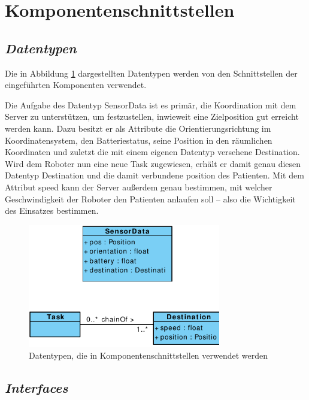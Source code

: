\section{Komponentenschnittstellen}

\subsection{\textit{Datentypen}}
Die in Abbildung \ref{KomponentenschnittstellenDiagramm} dargestellten Datentypen werden von den Schnittstellen der eingeführten Komponenten verwendet. 

Die Aufgabe des Datentyp SensorData ist es primär, die Koordination mit dem Server zu unterstützen, um festzustellen, inwieweit eine Zielposition gut erreicht werden kann. Dazu besitzt er als Attribute die Orientierungsrichtung im Koordinatensystem, den Batteriestatus, seine Position in den räumlichen Koordinaten und zuletzt die mit einem eigenen Datentyp versehene Destination. Wird dem Roboter nun eine neue Task zugewiesen, erhält er damit genau diesen Datentyp Destination und die damit verbundene position des Patienten. Mit dem Attribut speed kann der Server außerdem genau bestimmen, mit welcher Geschwindigkeit der Roboter den Patienten anlaufen soll – also die Wichtigkeit des Einsatzes bestimmen.

	
	\begin{figure}[H]
		\centering
		\includegraphics[width=0.75\textwidth]{img/0-Entwurf-3}
		\caption{Datentypen, die in Komponentenschnittstellen verwendet werden}
		\label{KomponentenschnittstellenDiagramm}
	\end{figure}
	\pagebreak

\subsection{\textit{Interfaces}}

